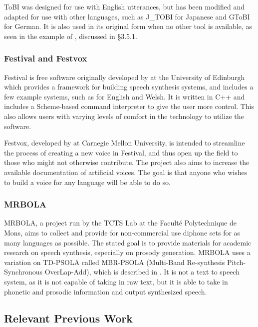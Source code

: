 \documentclass[12pt]{article}
\begin{document}
		ToBI was designed for use with English utterances, but has been modified and adapted for use with other languages, such as J\_TOBI for Japanese and GToBI for German. It is also used in its original form when no other tool is available, as seen in the example of \citet{mongolian}, discussed in \S 3.5.1. \par

		\subsubsection{Festival and Festvox}
		Festival is free software originally developed by \citet{festival} at the University of Edinburgh which provides a framework for building speech synthesis systems, and includes a few example systems, such as for English and Welsh. It is written in C++ and includes a Scheme-based command interpreter to give the user more control. This also allows users with varying levels of comfort in the technology to utilize the software. \par

		Festvox, developed by \citet{festvox} at Carnegie Mellon University, is intended to streamline the process of creating a new voice in Festival, and thus open up the field to those who might not otherwise contribute. The project also aims to increase the available documentation of artificial voices. The goal is that anyone who wishes to build a voice for any language will be able to do so. \par

		\subsubsection{MRBOLA}
		MRBOLA, a project run by the TCTS Lab at the Facult\'e Polytechnique de Mons, aims to collect and provide for non-commercial use diphone sets for as many languages as possible. The stated goal is to provide materials for academic research on speech synthesis, especially on prosody generation. MRBOLA uses a variation on TD-PSOLA called MBR-PSOLA (Multi-Band Re-synthesis Pitch-Synchronous OverLap-Add), which is described in \citet{four_cand}. It is not a text to speech system, as it is not capable of taking in raw text, but it is able to take in phonetic and prosodic information and output synthesized speech. \par

	\subsection{Relevant Previous Work}
\end{document}
